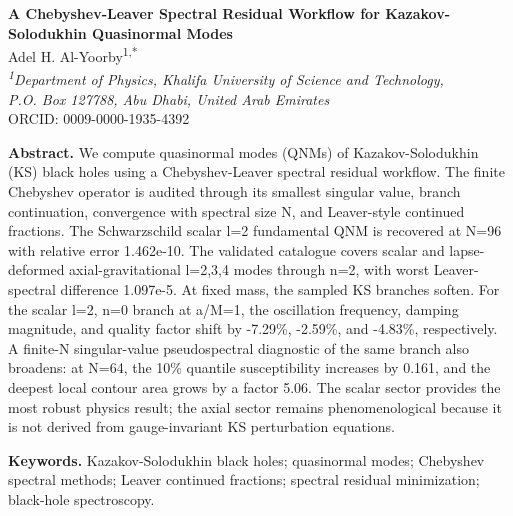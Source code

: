 ﻿\documentclass[12pt,a4paper]{article}
\begin{document}
\begin{center}
{\Large\bfseries A Chebyshev-Leaver Spectral Residual Workflow for Kazakov-Solodukhin Quasinormal Modes}\\
\vspace{1.2em}
{\normalsize Adel H. Al-Yoorby\textsuperscript{1,*}}\\
\vspace{0.25em}
{\itshape \textsuperscript{1}Department of Physics, Khalifa University of Science and Technology,}\\
{\itshape P.O. Box 127788, Abu Dhabi, United Arab Emirates}\\
\vspace{0.25em}
{\small ORCID: 0009-0000-1935-4392}
\end{center}

\begin{center}
\begin{minipage}{0.92\textwidth}
\small
\noindent\textbf{Abstract.}
We compute quasinormal modes (QNMs) of Kazakov-Solodukhin (KS) black holes using a Chebyshev-Leaver spectral residual workflow. The finite Chebyshev operator is audited through its smallest singular value, branch continuation, convergence with spectral size N, and Leaver-style continued fractions. The Schwarzschild scalar l=2 fundamental QNM is recovered at N=96 with relative error 1.462e-10. The validated catalogue covers scalar and lapse-deformed axial-gravitational l=2,3,4 modes through n=2, with worst Leaver-spectral difference 1.097e-5. At fixed mass, the sampled KS branches soften. For the scalar l=2, n=0 branch at a/M=1, the oscillation frequency, damping magnitude, and quality factor shift by -7.29\%, -2.59\%, and -4.83\%, respectively. A finite-N singular-value pseudospectral diagnostic of the same branch also broadens: at N=64, the 10\% quantile susceptibility increases by 0.161, and the deepest local contour area grows by a factor 5.06. The scalar sector provides the most robust physics result; the axial sector remains phenomenological because it is not derived from gauge-invariant KS perturbation equations.

\vspace{0.65em}
\noindent\textbf{Keywords.}
Kazakov-Solodukhin black holes; quasinormal modes; Chebyshev spectral methods; Leaver continued fractions; spectral residual minimization; black-hole spectroscopy.
\end{minipage}
\end{center}
\vspace{1.0em}
\begingroup
\renewcommand{\thefootnote}{*}
\endgroup
\thispagestyle{empty}
\end{document}
